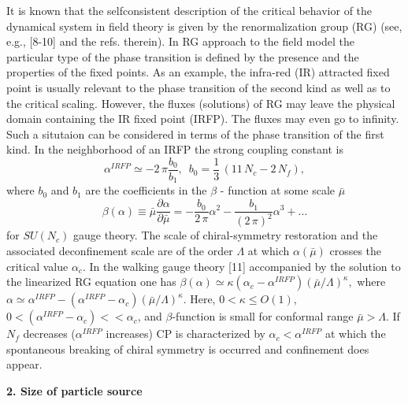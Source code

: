 \documentclass[WPCF,manyauthors]{wpcfTemplate}
\begin{document}
It is known that the selfconsistent description of the critical behavior of the dynamical system in field theory is given by the renormalization group (RG) (see, e.g., [8-10] and the refs. therein). In RG approach to the field model the particular type of the phase transition is defined by the presence and the properties of the fixed points. As an example, the infra-red (IR)  attracted fixed point is usually relevant to the phase transition of the second kind as well as to the critical scaling. However, the fluxes (solutions) of RG may leave the physical domain containing the IR fixed point (IRFP). The fluxes may even go to infinity. Such a situtaion can be considered in terms of the phase transition of the first kind. In the neighborhood of an IRFP the strong coupling constant is 
$$\alpha^{IRFP}\simeq - 2\,\pi\frac{b_{0}}{b_{1}}, \,\,\, b_{0} = \frac{1}{3}\,(11\,N_{c} - 2\,N_{f}),$$
where $b_{0}$ and $b_{1}$ are the coefficients in the $\beta$ - function at some scale $\bar\mu$
$$\beta (\alpha) \equiv \bar\mu\frac{\partial\alpha}{\partial\bar\mu} = - \frac{b_{0}}{2\,\pi}\alpha^{2} - 
\frac{b_{1}}{(2\,\pi)^{2}}\alpha^{3} + ... $$
for $SU(N_{c})$ gauge theory. The scale of chiral-symmetry restoration and the associated deconfinement scale are of the order $\Lambda$ at which $\alpha (\bar\mu)$ crosses the critical value $\alpha_{c}$. In the walking gauge theory [11] accompanied by the solution to the linearized RG equation one has
$\beta (\alpha) \simeq \kappa \left (\alpha_{c} - \alpha^{IRFP}\right ) 
{\left (\bar\mu/\Lambda\right )}^{\kappa}, $
where $\alpha \simeq \alpha^{IRFP} - \left (\alpha^{IRFP} - \alpha_{c} \right ) 
{\left (\bar\mu/\Lambda\right )}^{\kappa} $. 
Here, $0 < \kappa\leq O(1)$, $0 < (\alpha^{IRFP} - \alpha _{c} ) << \alpha_{c}$, and $\beta$-function is small for conformal range $\bar\mu > \Lambda$. If $N_{f}$ decreases ($\alpha^{IRFP}$ increases) CP is characterized by $\alpha_{c} < \alpha^{IRFP}$ at which the spontaneous breaking of chiral symmetry is occurred and confinement does appear.

 
{\bf 2. Size of particle source}
\end{document}
